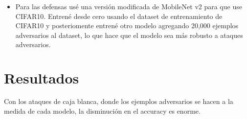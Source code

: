 \documentclass[10pt]{article}
\begin{document}
\begin{multicols*}{2}
\begin{itemize}
\item Para las defensas usé una versión modificada de MobileNet v2 para que use CIFAR10. Entrené desde cero usando el dataset de entrenamiento de CIFAR10 y posteriomente entrené otro modelo agregando 20,000 ejemplos adversarios al dataset, lo que hace que el modelo sea más robusto a ataques adversarios. 
\end{itemize}

\section{Resultados}

Con los ataques de caja blanca, donde los ejemplos adversarios se hacen a la medida de cada modelo, la disminución en el accuracy es enorme.

\begin{table}[H]
	\centering
\end{table}
\end{multicols*}
\end{document}
